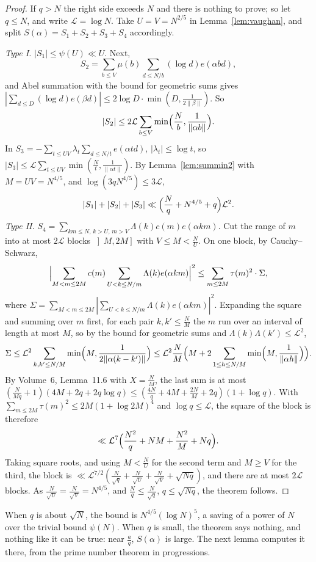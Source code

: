 \begin{proof}
If $q>N$ the right side exceeds $N$ and there is nothing to prove; so let $q\le N$, and write $\mathcal L=\log N$. Take $U=V=N^{2/5}$ in Lemma~\ref{lem:vaughan}, and split $S(\alpha)=S_1+S_2+S_3+S_4$ accordingly.

\emph{Type I.} $|S_1|\le\psi(U)\ll U$. Next,
\[
S_2=\sum_{b\le V}\mu(b)\sum_{d\le N/b}(\log d)e(\alpha bd),
\]
and Abel summation with the bound for geometric sums gives $|\sum_{d\le D}(\log d)e(\beta d)|\le2\log D\cdot\min(D,\frac1{2\|\beta\|})$. So
\[
|S_2|\le2\mathcal L\sum_{b\le V}\min\Bigl(\frac Nb,\frac1{\|\alpha b\|}\Bigr).
\]
In $S_3=-\sum_{t\le UV}\lambda_t\sum_{d\le N/t}e(\alpha td)$, $|\lambda_t|\le\log t$, so $|S_3|\le\mathcal L\sum_{t\le UV}\min(\frac Nt,\frac1{\|\alpha t\|})$. By Lemma~\ref{lem:summin2} with $M=UV=N^{4/5}$, and $\log(3qN^{4/5})\le3\mathcal L$,
\[
|S_1|+|S_2|+|S_3|\ll\Bigl(\frac Nq+N^{4/5}+q\Bigr)\mathcal L^2.
\]
\emph{Type II.} $S_4=\sum_{km\le N,\,k>U,\,m>V}\Lambda(k)c(m)e(\alpha km)$. Cut the range of $m$ into at most $2\mathcal L$ blocks $\left]M,2M\right]$ with $V\le M<\frac NU$. On one block, by Cauchy--Schwarz,
\[
\Bigl|\sum_{M<m\le2M}c(m)\sum_{U<k\le N/m}\Lambda(k)e(\alpha km)\Bigr|^2\le\sum_{m\le2M}\tau(m)^2\cdot\Sigma,
\]
where $\Sigma=\sum_{M<m\le2M}|\sum_{U<k\le N/m}\Lambda(k)e(\alpha km)|^2$. Expanding the square and summing over $m$ first, for each pair $k,k'\le\frac NM$ the $m$ run over an interval of length at most $M$, so by the bound for geometric sums and $\Lambda(k)\Lambda(k')\le\mathcal L^2$,
\[
\Sigma\le\mathcal L^2\sum_{k,k'\le N/M}\min\Bigl(M,\frac1{2\|\alpha(k-k')\|}\Bigr)\le\mathcal L^2\frac NM\Bigl(M+2\sum_{1\le h\le N/M}\min\Bigl(M,\frac1{\|\alpha h\|}\Bigr)\Bigr).
\]
By Volume~6, Lemma~11.6 with $X=\frac NM$, the last sum is at most $(\frac N{Mq}+1)(4M+2q+2q\log q)\le(\frac{4N}q+4M+\frac{2N}M+2q)(1+\log q)$. With $\sum_{m\le2M}\tau(m)^2\le2M(1+\log2M)^4$ and $\log q\le\mathcal L$, the square of the block is therefore
\[
\ll\mathcal L^7\Bigl(\frac{N^2}q+NM+\frac{N^2}M+Nq\Bigr).
\]
Taking square roots, and using $M<\frac NU$ for the second term and $M\ge V$ for the third, the block is $\ll\mathcal L^{7/2}(\frac N{\sqrt q}+\frac N{\sqrt U}+\frac N{\sqrt V}+\sqrt{Nq})$, and there are at most $2\mathcal L$ blocks. As $\frac N{\sqrt U}=\frac N{\sqrt V}=N^{4/5}$, and $\frac Nq\le\frac N{\sqrt q}$, $q\le\sqrt{Nq}$, the theorem follows.
\end{proof}

When $q$ is about $\sqrt N$, the bound is $N^{4/5}(\log N)^5$, a saving of a power of $N$ over the trivial bound $\psi(N)$. When $q$ is small, the theorem says nothing, and nothing like it can be true: near $\frac aq$, $S(\alpha)$ is large. The next lemma computes it there, from the prime number theorem in progressions.

